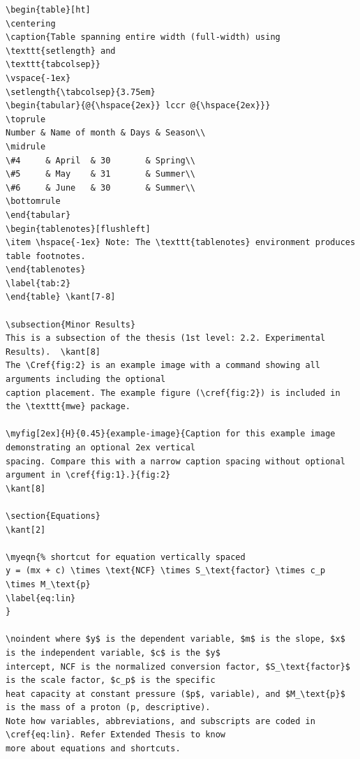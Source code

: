 \documentclass{article}
\begin{document}
{\begin{verbatim}
\begin{table}[ht]
\centering
\caption{Table spanning entire width (full-width) using \texttt{setlength} and
\texttt{tabcolsep}}
\vspace{-1ex}
\setlength{\tabcolsep}{3.75em}
\begin{tabular}{@{\hspace{2ex}} lccr @{\hspace{2ex}}}
\toprule
Number & Name of month & Days & Season\\
\midrule
\#4 	& April  & 30		& Spring\\
\#5 	& May    & 31		& Summer\\
\#6 	& June   & 30		& Summer\\
\bottomrule
\end{tabular}
\begin{tablenotes}[flushleft]
\item \hspace{-1ex} Note: The \texttt{tablenotes} environment produces table footnotes. 
\end{tablenotes}
\label{tab:2}
\end{table}	\kant[7-8]

\subsection{Minor Results}
This is a subsection of the thesis (1st level: 2.2. Experimental Results). 	\kant[8]
The \Cref{fig:2} is an example image with a command showing all arguments including the optional 
caption placement. The example figure (\cref{fig:2}) is included in the \texttt{mwe} package.

\myfig[2ex]{H}{0.45}{example-image}{Caption for this example image demonstrating an optional 2ex vertical 
spacing. Compare this with a narrow caption spacing without optional argument in \cref{fig:1}.}{fig:2}    
\kant[8]

\section{Equations}
\kant[2]

\myeqn{% shortcut for equation vertically spaced
y = (mx + c) \times \text{NCF} \times S_\text{factor} \times c_p \times M_\text{p}
\label{eq:lin}
}

\noindent where $y$ is the dependent variable, $m$ is the slope, $x$ is the independent variable, $c$ is the $y$ 
intercept, NCF is the normalized conversion factor, $S_\text{factor}$ is the scale factor, $c_p$ is the specific 
heat capacity at constant pressure ($p$, variable), and $M_\text{p}$ is the mass of a proton (p, descriptive). 
Note how variables, abbreviations, and subscripts are coded in \cref{eq:lin}. Refer Extended Thesis to know 
more about equations and shortcuts. 


\end{verbatim}}
\end{document}
